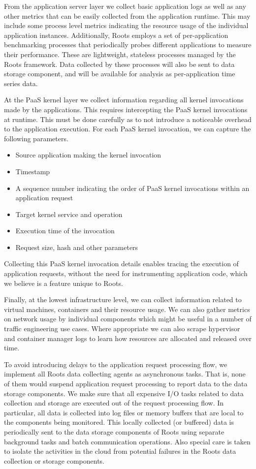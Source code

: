From the application server layer we collect basic application logs as well as any other
metrics that can be easily collected from the application runtime. This may include some process level
metrics indicating the resource usage of the individual application instances. Additionally, Roots
employs a set of per-application benchmarking processes that periodically probes 
different applications
to measure their performance. These are lightweight, stateless processes managed by the Roots framework.
Data collected by these processes will also be sent to data storage component, and will be available
for analysis as per-application time series data. 

At the PaaS kernel layer we collect information regarding all kernel invocations
made by the applications. This requires intercepting the PaaS kernel invocations
at runtime. This must be done carefully as to not introduce a noticeable
overhead to the application execution. For each PaaS kernel invocation, we can capture the 
following parameters.
\begin{itemize}
\item Source application making the kernel invocation
\item Timestamp
\item A sequence number indicating the order of PaaS kernel invocations within an application request
\item Target kernel service and operation
\item Execution time of the invocation
\item Request size, hash and other parameters
\end{itemize}
Collecting this PaaS kernel invocation details enables tracing the execution of application 
requests, without the need for instrumenting application code, which we believe is a feature 
unique to Roots. 

Finally, at the lowest infrastructure level, we can collect information related to virtual machines, containers
and their resource usage. We can also gather metrics on network usage by individual components which
might be useful in a number of traffic engineering use cases. Where appropriate we can also scrape
hypervisor and container manager logs to learn how resources are allocated and released over time.

To avoid introducing delays to the application request processing flow, we implement
all Roots data collecting agents as asynchronous tasks. That is, none of them would
suspend application request processing to report data to the data storage components.
We make sure that all expensive I/O tasks related to data collection and storage are
executed out of the request processing flow.
In particular, all data is collected into log files or memory buffers that are local to the components being
monitored. This locally collected (or buffered) data is periodically sent
to the data storage components of Roots using separate background tasks and batch communication
operations. Also special care is taken to isolate the activities in the cloud from potential
failures in the Roots data collection or storage components.

